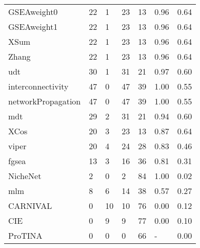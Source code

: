 \begin{newpdflayout}{210mm}{297mm}
\begin{table}[ht]
\begin{tabular}{lllllll}
GSEAweight0 & 22 & 1 & 23 & 13 & 0.96 & 0.64 \\
GSEAweight1 & 22 & 1 & 23 & 13 & 0.96 & 0.64 \\
XSum & 22 & 1 & 23 & 13 & 0.96 & 0.64 \\
Zhang & 22 & 1 & 23 & 13 & 0.96 & 0.64 \\
udt & 30 & 1 & 31 & 21 & 0.97 & 0.60 \\
interconnectivity & 47 & 0 & 47 & 39 & 1.00 & 0.55 \\
networkPropagation & 47 & 0 & 47 & 39 & 1.00 & 0.55 \\
mdt & 29 & 2 & 31 & 21 & 0.94 & 0.60 \\
XCos & 20 & 3 & 23 & 13 & 0.87 & 0.64 \\
viper & 20 & 4 & 24 & 28 & 0.83 & 0.46 \\
fgsea & 13 & 3 & 16 & 36 & 0.81 & 0.31 \\
NicheNet & 2 & 0 & 2 & 84 & 1.00 & 0.02 \\
mlm & 8 & 6 & 14 & 38 & 0.57 & 0.27 \\
CARNIVAL & 0 & 10 & 10 & 76 & 0.00 & 0.12 \\
CIE & 0 & 9 & 9 & 77 & 0.00 & 0.10 \\
ProTINA & 0 & 0 & 0 & 66 & - & 0.00 \\ \hline
\end{tabular}
\end{table}


\end{newpdflayout}
